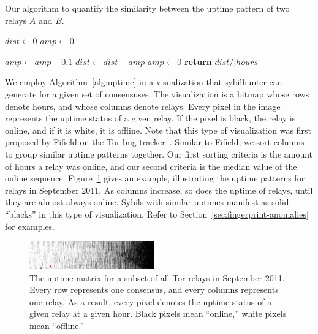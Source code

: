 \begin{algorithm}[t]
\caption{Our algorithm to quantify the similarity between the uptime pattern
of two relays $A$ and $B$.}
\label{alg:uptime}
\begin{algorithmic}[1]
    \State $dist \gets 0$
    \State $amp \gets 0$

                \State $amp \gets amp + 0.1$
            \EndIf
        \State $dist \gets dist + amp$
        \Else
            \State $amp \gets 0$
        \EndIf
    \EndFor
    \State \textbf{return} $dist / \lvert hours \rvert$
\EndFunction
\end{algorithmic}
\end{algorithm}

We employ Algorithm~\ref{alg:uptime} in a visualization that sybilhunter can
generate for a given set of consensuses.  The visualization is a bitmap whose
rows denote hours, and whose columns denote relays.  Every pixel in the image
represents the uptime status of a given relay.  If the pixel is black, the relay
is online, and if it is white, it is offline.  Note that this type of
visualization was first proposed by Fifield on the Tor bug
tracker~\cite{Fifield2014a}.  Similar to Fifield, we sort columns to group
similar uptime patterns together.  Our first sorting criteria is the amount of
hours a relay was online, and our second criteria is the median value of the
online sequence.  Figure~\ref{fig:uptime-matrix} gives an example, illustrating
the uptime patterns for relays in September 2011.  As columns increase, so does
the uptime of relays, until they are almost always online.  Sybils with similar
uptimes manifest as solid ``blacks'' in this type of visualization.  Refer to
Section~\ref{sec:fingerprint-anomalies} for examples.

\begin{figure}[t]
	\centering
	\includegraphics[width=0.48\textwidth]{diagrams/2011-09-uptimes-truncated.jpg}
	\caption{The uptime matrix for a subset of all Tor relays in September 2011.
		Every row represents one consensus, and every columns represents one
		relay.  As a result, every pixel denotes the uptime status of a given
		relay at a given hour.  Black pixels mean ``online,'' white pixels mean
		``offline.''}
	\label{fig:uptime-matrix}
\end{figure}


